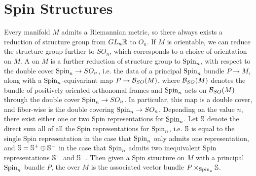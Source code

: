%
\section{Spin Structures}
%
Every manifold $M$ admits a Riemannian metric, so there always exists a
reduction of structure group from $GL_n\R$ to $O_n$. If $M$ is orientable,
we can reduce the structure group further to $SO_n$, which corresponds to a
choice of orientation on $M$. A  on $M$
is a further reduction of structure group to $\Spin_n$, with respect to the
double cover $\Spin_n \to SO_n$, i.e. the data of a principal $\Spin_n$ bundle
$P \to M$, along with a $\Spin_n$-equivariant map $P \to \B_{SO}(M)$, where
$\B_{SO}(M)$ denotes the bundle of positively oriented orthonomal frames
and $\Spin_n$ acts on $\B_{SO}(M)$ through the double cover $\Spin_n \to SO_n$. In
particular, this map is a double cover, and fiber-wise is the double covering
$\Spin_n \to SO_n$.
Depending on the value $n$, there exist either one or two Spin representations
for $\Spin_n$. Let $\S$ denote the direct sum all of all the Spin representations
for $\Spin_n$, i.e. $\S$ is equal to the single Spin representation in the
case that $\Spin_n$ only admits one representation, and $\S = \S^+ \oplus \S^-$
in the case that $\Spin_n$ admits two inequivalent Spin representations $\S^+$
and $\S^-$. Then given a Spin structure on $M$ with a principal $\Spin_n$ bundle
$P$, the  over $M$ is the associated vector bundle
$P \times_{\Spin_n} \S$.
%
